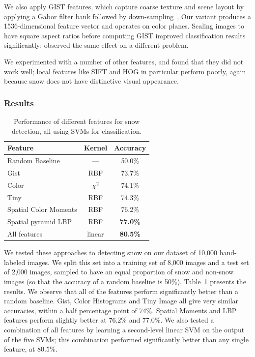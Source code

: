  We also apply GIST features, which capture coarse texture
and scene layout by applying a Gabor filter bank followed by
down-sampling~\cite{oliva2001modeling}, Our variant produces a
1536-dimensional feature vector and operates on color planes. Scaling
images to have square aspect ratios before computing GIST improved
classification results significantly; \cite{douze2009evaluation}
observed the same effect on a different problem.


We experimented with a number of other features, and found
that they did not work well; local features like SIFT and HOG in
particular perform poorly, again because snow does not have
distinctive visual appearance. 

\subsubsection*{Results}




\begin{table}[b]
\begin{center}
{\footnotesize{
\begin{tabular}{|l|c|c|}
\hline 
Feature & Kernel  & Accuracy\tabularnewline
\hline 
\hline 
Random Baseline  & --- & 50.0\%\tabularnewline
\hline 
\hline
Gist & RBF & 73.7\%\tabularnewline
\hline 
Color  & $\chi^2$ & 74.1\%\tabularnewline
\hline
Tiny & RBF & 74.3\%\tabularnewline
\hline 
Spatial Color Moments & RBF & 76.2\%\tabularnewline
\hline 
Spatial pyramid LBP & RBF &\textbf{77.0\%}\tabularnewline
\hline 
\hline
All features  & linear & \textbf{80.5\%}\tabularnewline
\hline 
\end{tabular}
}}
\caption{Performance of different features  for snow detection, all using SVMs for classification. }
\label{tab:snow}
\end{center}
\end{table}


We tested these approaches to detecting snow on our dataset of
10,000 hand-labeled images. We split this set into a training set of
8,000 images and a test set of 2,000 images, sampled to have an
 equal proportion of snow and non-snow images (so
that the accuracy of a random baseline is 50\%).
Table~\ref{tab:snow} presents the results. We observe that all of the
features perform significantly better than a random baseline. 
Gist, Color Histograms and Tiny Image all give very similar accuracies, within a half
percentage point of 74\%. Spatial Moments and
LBP  features perform
slightly better at 76.2\% and 77.0\%. We also tested a combination of all 
features by learning a second-level linear SVM on the output of the
five SVMs; this combination performed significantly better than any single feature,
at 80.5\%.


